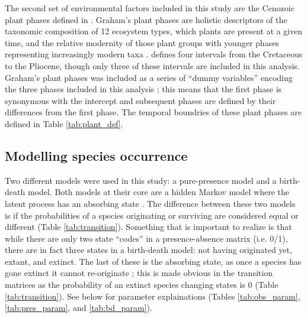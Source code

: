 \documentclass[12pt,letterpaper]{article}
\begin{document}
The second set of environmental factors included in this study are the Cenozoic plant phases defined in \citet{Graham2011a}. Graham's plant phases are holistic descriptors of the taxonomic composition of 12 ecosystem types, which plants are present at a given time, and the relative modernity of those plant groups with younger phases representing increasingly modern taxa \citep{Graham2011a}. \citet{Graham2011a} defines four intervals from the Cretaceous to the Pliocene, though only three of these intervals are included in this analysis. Graham's plant phases was included as a series of ``dummy variables'' encoding the three phases included in this analysis \citep{Gelman2007}; this means that the first phase is synonymous with the intercept and subsequent phases are defined by their differences from the first phase. The temporal boundries of these plant phases are defined in Table \ref{tab:plant_def}.


\subsection*{Modelling species occurrence}
Two different models were used in this study: a pure-presence model and a birth-death model. Both models at their core are a hidden Markov model where the latent process has an absorbing state \citep{Allen2011}. The difference between these two models is if the probabilities of a species originating or surviving are considered equal or different (Table \ref{tab:transition}). Something that is important to realize is that while there are only two state ``codes'' in a presence-absence matrix (i.e. 0/1), there are in fact three states in a birth-death model: not having originated yet, extant, and extinct. The last of these is the absorbing state, as once a species has gone extinct it cannot re-originate \citep{Allen2011}; this is made obvious in the transition matrices as the probability of an extinct species changing states is 0 (Table \ref{tab:transition}). See below for parameter explainations (Tables \ref{tab:obs_param}, \ref{tab:pres_param}, and \ref{tab:bd_param}).
\end{document}
